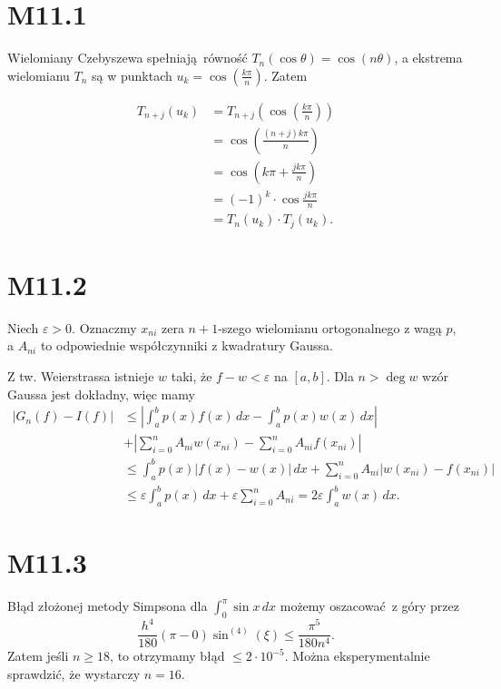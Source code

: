 \documentclass[a4paper, 12pt]{article}
\title{}
\author{Wiktor Kuchta}
\date{\vspace{-4ex}}
\newcommand{\modulus}[1]{\left| #1 \right|}
\newcommand{\abs}{\modulus}
\newcommand{\+}{\enspace}
\begin{document}
\maketitle

\section*{M11.1}

Wielomiany Czebyszewa spełniają równość $T_n(\cos θ) = \cos (nθ)$,
a ekstrema wielomianu $T_n$ są w punktach
$u_k = \cos \left(\frac{kπ}{n}\right)$.
Zatem

\begin{align*}
T_{n+j}(u_k)
&= T_{n+j} \left(\cos \left(\frac{kπ}{n}\right)\right) \\
&= \cos \left(\frac{(n+j)kπ}{n}\right) \\
&= \cos \left(kπ+\frac{jkπ}{n}\right) \\
&= (-1)^k · \cos \frac{jkπ}{n} \\
&= T_n(u_k) · T_j(u_k).
\end{align*}

\section*{M11.2}

Niech $ε > 0$.
Oznaczmy $x_{ni}$ zera $n+1$-szego wielomianu ortogonalnego z wagą $p$,
a $A_{ni}$ to odpowiednie współczynniki z kwadratury Gaussa.

Z tw. Weierstrassa istnieje $w$ taki, że $f-w < ε$ na $[a,b]$.  %
Dla $n > \deg w$ wzór Gaussa jest dokładny, więc mamy
\begin{align*}
\abs{G_n(f) - I(f)}
&≤ \abs{∫_a^b p(x) f(x)\,dx - ∫_a^b p(x) w(x) \, dx} \\
&+ \abs{∑_{i=0}^n A_{ni}w(x_{ni}) - ∑_{i=0}^n A_{ni}f(x_{ni})} \\
&≤ ∫_a^b p(x)\abs{f(x) - w(x)}\,dx + ∑_{i=0}^n A_{ni}\abs{w(x_{ni})- f(x_{ni})} \\
&≤ ε ∫_a^b p(x)\,dx + ε∑_{i=0}^n A_{ni} = 2ε ∫_a^b w(x) \, dx.
\end{align*}


\section*{M11.3}
Błąd złożonej metody Simpsona dla $∫_0^{π} \sin x\,dx$ możemy oszacować z góry przez
$$\frac{h^4}{180}(π-0)\sin^{(4)}(ξ) ≤ \frac{π^5}{180 n^4}.$$
Zatem jeśli $n≥18$, to otrzymamy błąd $≤ 2·10^{-5}$.
Można eksperymentalnie sprawdzić, że wystarczy $n=16$.
\end{document}
